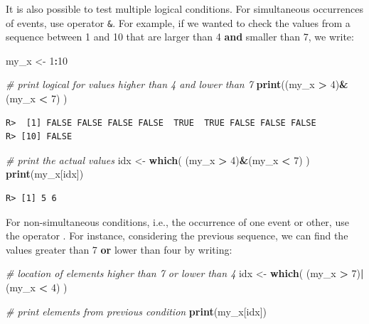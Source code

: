 \documentclass[
  12pt,
]{book}
\newenvironment{Shaded}{\begin{snugshade}}{\end{snugshade}}
\newcommand{\CommentTok}[1]{\textcolor[rgb]{0.37,0.37,0.37}{\textit{#1}}}
\newcommand{\DecValTok}[1]{\textcolor[rgb]{0.06,0.06,0.06}{#1}}
\newcommand{\KeywordTok}[1]{\textcolor[rgb]{0.27,0.27,0.27}{\textbf{#1}}}
\newcommand{\NormalTok}[1]{#1}
\newcommand{\OperatorTok}[1]{\textcolor[rgb]{0.43,0.43,0.43}{\textbf{#1}}}
\newcommand{\StringTok}[1]{\textcolor[rgb]{0.5,0.5,0.5}{#1}}
\begin{document}
It is also possible to test multiple logical conditions. For simultaneous occurrences of events, use operator \texttt{\&}. For example, if we wanted to check the values from a sequence between 1 and 10 that are larger than 4 \textbf{and} smaller than 7, we write: 

\begin{Shaded}
\begin{Highlighting}[]
\NormalTok{my_x <-}\StringTok{ }\DecValTok{1}\OperatorTok{:}\DecValTok{10}

\CommentTok{# print logical for values higher than 4 and lower than 7}
\KeywordTok{print}\NormalTok{((my_x }\OperatorTok{>}\StringTok{ }\DecValTok{4}\NormalTok{)}\OperatorTok{&}\NormalTok{(my_x }\OperatorTok{<}\StringTok{ }\DecValTok{7}\NormalTok{) )}
\end{Highlighting}
\end{Shaded}

\begin{verbatim}
R>  [1] FALSE FALSE FALSE FALSE  TRUE  TRUE FALSE FALSE FALSE
R> [10] FALSE
\end{verbatim}

\begin{Shaded}
\begin{Highlighting}[]
\CommentTok{# print the actual values}
\NormalTok{idx <-}\StringTok{ }\KeywordTok{which}\NormalTok{( (my_x }\OperatorTok{>}\StringTok{ }\DecValTok{4}\NormalTok{)}\OperatorTok{&}\NormalTok{(my_x }\OperatorTok{<}\StringTok{ }\DecValTok{7}\NormalTok{) )}
\KeywordTok{print}\NormalTok{(my_x[idx])}
\end{Highlighting}
\end{Shaded}

\begin{verbatim}
R> [1] 5 6
\end{verbatim}

For non-simultaneous conditions, i.e., the occurrence of one event or other, use the operator \texttt{\textbar{}}. For instance, considering the previous sequence, we can find the values greater than 7 \textbf{or} lower than four by writing: 

\begin{Shaded}
\begin{Highlighting}[]
\CommentTok{# location of elements higher than 7 or lower than 4}
\NormalTok{idx <-}\StringTok{ }\KeywordTok{which}\NormalTok{( (my_x }\OperatorTok{>}\StringTok{ }\DecValTok{7}\NormalTok{)}\OperatorTok{|}\NormalTok{(my_x }\OperatorTok{<}\StringTok{ }\DecValTok{4}\NormalTok{) )}

\CommentTok{# print elements from previous condition}
\KeywordTok{print}\NormalTok{(my_x[idx])}
\end{Highlighting}
\end{Shaded}
\end{document}
